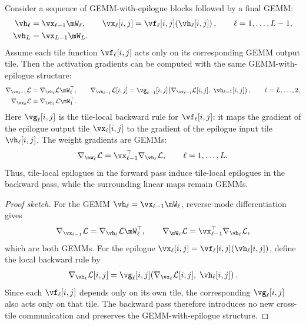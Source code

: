 \begin{theorem}
\label{thm:gemm-epilogue-backward}
Consider a sequence of GEMM-with-epilogue blocks followed by a final GEMM:
\begin{align*}
\vh_{\ell} &= \vx_{\ell-1}\mW_{\ell}, \qquad
\vx_{\ell}[i,j] =
\vf_{\ell}[i,j]\!\left(\vh_{\ell}[i,j]\right),
\qquad \ell=1,\ldots,L-1, \\
\vh_L &= \vx_{L-1}\mW_L .
\end{align*}
Assume each tile function $\vf_{\ell}[i,j]$ acts only on its corresponding
GEMM output tile. Then the activation gradients can be computed with the same
GEMM-with-epilogue structure:
\begin{align*}
\nabla_{\vx_{\ell-1}}\mathcal{L}
&=
\nabla_{\vh_{\ell}}\mathcal{L}\mW_{\ell}^{\top}, \qquad
\nabla_{\vh_{\ell-1}}\mathcal{L}[i,j]
=
\vg_{\ell-1}[i,j]\!\left(
\nabla_{\vx_{\ell-1}}\mathcal{L}[i,j],\;
\vh_{\ell-1}[i,j]
\right),
\qquad \ell=L,\ldots,2, \\
\nabla_{\vx_0}\mathcal{L}
&=
\nabla_{\vh_1}\mathcal{L}\mW_1^{\top}.
\end{align*}
Here $\vg_{\ell}[i,j]$ is the tile-local backward rule for
$\vf_{\ell}[i,j]$: it maps the gradient of the epilogue output tile
$\vx_{\ell}[i,j]$ to the gradient of the epilogue input tile
$\vh_{\ell}[i,j]$. The weight gradients are GEMMs:
\begin{align*}
\nabla_{\mW_{\ell}}\mathcal{L}
=
\vx_{\ell-1}^{\top}\nabla_{\vh_{\ell}}\mathcal{L},
\qquad \ell=1,\ldots,L .
\end{align*}
Thus, tile-local epilogues in the forward pass induce tile-local epilogues in
the backward pass, while the surrounding linear maps remain GEMMs.
\end{theorem}

\begin{proof}[Proof sketch]
For the GEMM $\vh_{\ell}=\vx_{\ell-1}\mW_{\ell}$, reverse-mode differentiation gives
\begin{align*}
\nabla_{\vx_{\ell-1}}\mathcal{L}
=
\nabla_{\vh_{\ell}}\mathcal{L}\mW_{\ell}^{\top},
\qquad
\nabla_{\mW_{\ell}}\mathcal{L}
=
\vx_{\ell-1}^{\top}\nabla_{\vh_{\ell}}\mathcal{L},
\end{align*}
which are both GEMMs. For the epilogue
$\vx_{\ell}[i,j]=\vf_{\ell}[i,j](\vh_{\ell}[i,j])$, define the local backward
rule by
\begin{align*}
\nabla_{\vh_{\ell}}\mathcal{L}[i,j]
=
\vg_{\ell}[i,j]\!\left(
\nabla_{\vx_{\ell}}\mathcal{L}[i,j],\;
\vh_{\ell}[i,j]
\right).
\end{align*}
Since each $\vf_{\ell}[i,j]$ depends only on its own tile, the corresponding
$\vg_{\ell}[i,j]$ also acts only on that tile. The backward pass therefore
introduces no new cross-tile communication and preserves the
GEMM-with-epilogue structure.
\end{proof}

